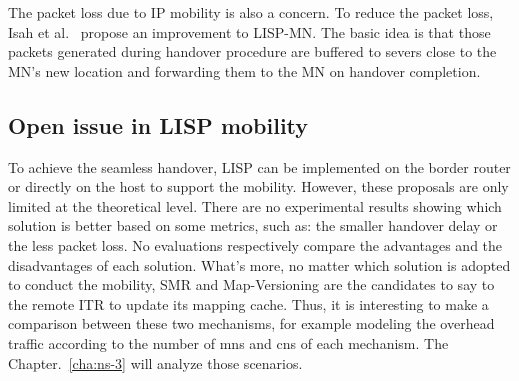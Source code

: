 The packet loss due to IP mobility is also a concern. To reduce the packet loss, Isah et al.~\cite{isah2017towards} propose an improvement to LISP-MN. The basic idea is that those packets generated during handover procedure are buffered to severs close to the MN’s new location and forwarding them to the MN on handover completion.


\subsection{Open issue in LISP mobility}
\label{subsec:mobility_missing}
To achieve the seamless handover, LISP can be implemented on the border router or directly on the host to support the mobility. However, these proposals are only limited at the theoretical level. There are no experimental results showing which solution is better based on some metrics, such as: the smaller handover delay or the less packet loss. No evaluations respectively compare the advantages and the disadvantages of each solution. What's more, no matter which solution is adopted to conduct the mobility, SMR and Map-Versioning are the candidates to say to the remote ITR to update its mapping cache. Thus, it is interesting to make a comparison between these two mechanisms, for example modeling the overhead traffic according to the number of \acrshort{mn}s and \acrshort{cn}s of each mechanism. The Chapter.~\ref{cha:ns-3} will analyze those scenarios.


